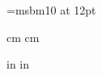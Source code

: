 \def\dif{\partial}
\def\difb{\bar{\partial}} \def\dbar{\bar{\partial}}
\def\pab{\bar{\pa}}
\def\nonu{\nonumber \\{}}
\def\half{{1 \over 2}}

\def\bfx{{\bf x}}
\def\bfy{{\bf y}}
\def\bfk{{\bf k}}
\def\bfl{{\bf l}}

\font\mybb=msbm10 at 12pt
\def\bb#1{\hbox{\mybb#1}}
\def\bZ {\bb{Z}}
\def\bR {\bb{R}}
\def\bE {\bb{E}}
\def\bT {\bb{T}}
\def\bM {\bb{M}}
\def\II{{\unit}}
\def\cM {{\cal{M}}}



 cm
 cm

\textwidth 16cm
 in
 in


\def\g0{g_{(0)}}
\def\gi{g_{(0)}^{-1}}
\newcommand{\sm}[1]{\mbox{\scriptsize #1}} 
\newcommand{\tnnn}[1]{\mbox{\tiny #1}} 
\def\GN{G_{\mbox{\tnnn N}}}
\def\d{\mbox{d}} 
\renewcommand{\theequation}{\thesection.\arabic{equation}}



